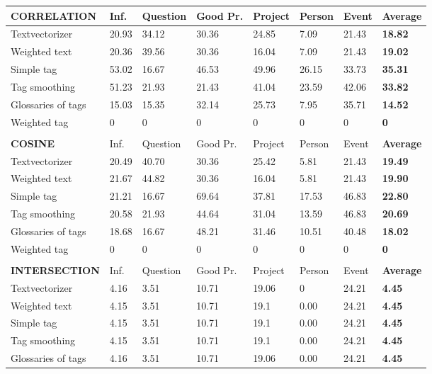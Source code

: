 \begin{table}

\begin{tabular}{| l | l | l | l | l | l | l | l |}
\hline
{\bf CORRELATION} & Inf. &  Question &  Good Pr.& Project & Person &  Event & {\bf Average} \\
\hline
Textvectorizer & 20.93 & 34.12 & 30.36 & 24.85 & 7.09 & 21.43 & {\bf 18.82} \\ 
Weighted text & 20.36 & 39.56 & 30.36 & 16.04 & 7.09 & 21.43 & {\bf 19.02} \\ 
Simple tag & 53.02 & 16.67 & 46.53 & 49.96 & 26.15 & 33.73 & {\bf 35.31} \\ 
Tag smoothing & 51.23 & 21.93 & 21.43 & 41.04 & 23.59 & 42.06 & {\bf 33.82} \\ 
Glossaries of tags & 15.03 & 15.35 & 32.14 & 25.73 & 7.95 & 35.71 & {\bf 14.52} \\ 
Weighted tag & 0 & 0 & 0 & 0 & 0 & 0 & {\bf 0} \\ 
\hline
\\
\hline
{\bf COSINE} & Inf. &  Question &  Good Pr.& Project & Person &  Event & {\bf Average} \\
\hline
Textvectorizer & 20.49 & 40.70 & 30.36 & 25.42 & 5.81 & 21.43 & {\bf 19.49} \\ 
Weighted text & 21.67 & 44.82 & 30.36 & 16.04 & 5.81 & 21.43 & {\bf 19.90} \\ 
Simple tag & 21.21 & 16.67 & 69.64 & 37.81 & 17.53 & 46.83 & {\bf 22.80 } \\ 
Tag smoothing & 20.58 & 21.93 & 44.64 & 31.04 & 13.59 & 46.83 & {\bf 20.69} \\ 
Glossaries of tags & 18.68 & 16.67 & 48.21 & 31.46 & 10.51 & 40.48 & {\bf 18.02} \\ 
Weighted tag & 0 & 0 & 0 & 0 & 0 & 0 & {\bf 0} \\ 
\hline
\\
\hline
{\bf INTERSECTION} & Inf. &  Question &  Good Pr.& Project & Person &  Event & {\bf Average} \\
\hline
Textvectorizer & 4.16 & 3.51 & 10.71 & 19.06 & 0 & 24.21 & {\bf 4.45} \\ 
Weighted text & 4.15 & 3.51 & 10.71 & 19.1 & 0.00 & 24.21 & {\bf 4.45} \\ 
Simple tag & 4.15 & 3.51 & 10.71 & 19.1 & 0.00 & 24.21 & {\bf 4.45} \\ 
Tag smoothing & 4.15 & 3.51 & 10.71 & 19.1 & 0.00 & 24.21 & {\bf 4.45} \\ 
Glossaries of tags & 4.16 & 3.51 & 10.71 & 19.06 & 0.00 & 24.21 & {\bf 4.45} \\ 

\end{tabular}
\end{table}
